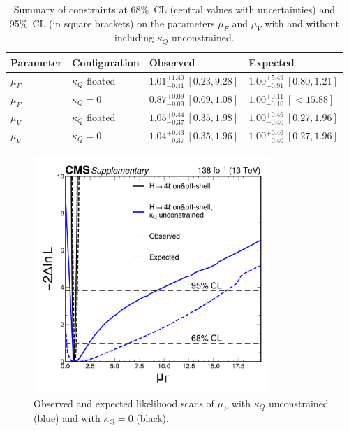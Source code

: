 \begin{table}[!hbt]
\centering
\begin{tabular}{llll}
\hline
Parameter       &     Configuration     & {Observed}          &  {Expected}   \\
\hline
$\mu_F$     & $\kappa_Q$ floated & $1.01^{+1.40}_{-0.41} ~[0.23,9.28]$   &  $1.00^{+5.49}_{-0.91} ~[0.80,1.21]$ \\
$\mu_F$     & $\kappa_Q=0$       & $0.87^{+0.09}_{-0.09} ~[0.69,1.08]$   &  $1.00^{+0.11}_{-0.10} ~[ < 15.88]$  \\
$\mu_V$     & $\kappa_Q$ floated & $1.05^{+0.44}_{-0.37} ~[0.35,1.98]$   &  $1.00^{+0.46}_{-0.40} ~[0.27,1.96]$  \\
$\mu_V$     & $\kappa_Q=0$       & $1.04^{+0.43}_{-0.37} ~[0.35,1.96]$   &  $1.00^{+0.46}_{-0.40} ~[0.27,1.96]$  \\
\hline
\end{tabular}
\caption{
Summary of constraints at 68\%~CL (central values with uncertainties) and 95\%~CL (in square brackets) on the parameters $\mu_F$ and $\mu_V$ with and without including $\kappa_Q$ unconstrained.}
\label{table:offshellKappa}
\end{table}

\begin{figure}[!hbt]
    \centering
    \includegraphics[width=0.8\textwidth]{figures/observed_muF.pdf}
    \caption{Observed and expected likelihood scans of $\mu_F$ with $\kappa_Q$ unconstrained (blue) and with $\kappa_Q=0$ (black).}
    \label{fig:kappa_muF_scan}
\end{figure}

